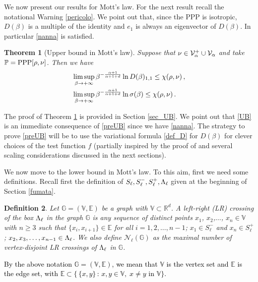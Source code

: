 \documentclass[12pt,a4paper,reqno]{amsart}
\newtheorem{Theorem}{Theorem}[section]
\newtheorem{Definition}[Theorem]{Definition}
\newcommand{\cN}{\ensuremath{\mathcal N}}
\newcommand{\cV}{\ensuremath{\mathcal V}}
\newcommand{\bbE}{{\ensuremath{\mathbb E}} }
\newcommand{\bbG}{{\ensuremath{\mathbb G}} }
\newcommand{\bbP}{{\ensuremath{\mathbb P}} }
\newcommand{\bbR}{{\ensuremath{\mathbb R}} }
\newcommand{\bbV}{{\ensuremath{\mathbb V}} }
\let\a=\alpha \let\b=\beta   \let\d=\delta  \let\e=\varepsilon
\newcommand{\rosso}{\textcolor{black}} %
\newcommand{\cv}{\rosso{\cV_\alpha}}
\newcommand{\cvp}{\rosso{\cV^+_\alpha}}
\begin{document}
We now present our results for Mott's law. For the next result recall  the notational Warning \ref{pericolo}. We point out that, since the PPP is isotropic, $D(\b)$ is a multiple of the identity and $e_1$ is always an eigenvector of $D(\b)$. In particular \eqref{nanna} is satisfied.

  \begin{Theorem}[Upper bound in Mott's law] \label{parataUB} Suppose that  $\nu\in \cvp\cup \cv$ and take $\bbP={\rm PPP}[\rho,\nu]$.
Then we have 
 \begin{align}
 &  \limsup _{\b\to +\infty} \b^{- \rosso{\frac{\a+1}{\a+1+d}} } \ln  D(\b)_{1,1}  \leq
  \chi (\rho, \nu)\,, \label{preUB}\\
&  \limsup _{\b\to +\infty} \b^{- \rosso{\frac{\a+1}{\a+1+d}} } \ln \s(\b)\leq   
\chi (\rho, \nu)
\,.\label{UB}
  \end{align}
\end{Theorem}
The proof of Theorem \ref{parataUB} is provided in Section \ref{sec_UB}. We point out that \eqref{UB} is an immediate consequence of \eqref{preUB} since we have  \eqref{nanna}. The strategy to prove \eqref{preUB} will be to use the variational formula \eqref{def_D} for $D(\b)$ for clever choices of the test function $f$ (partially inspired by the proof of \cite[Theorem~3.12]{PR} and several scaling considerations discussed in the next sections).

\smallskip

We now move to the lower bound in Mott's law.
To this aim, first we need some definitions.
Recall first the definition of $S_\ell, S_\ell^-, S_\ell^+, \Lambda_\ell$ given at the beginning of Section \ref{fumata}.
\begin{Definition}\label{def_LR} Let $\bbG=(\bbV,\bbE)$ be a graph with $\bbV\subset \bbR^d$.
A left-right (LR) crossing  of  the box $\Lambda_\ell$ in the graph  $\bbG$    is any  sequence of distinct points $x_1$, $x_2$,$\dots$, $x_n \in \bbV$  with $n\geq 3$  such that 
$\{x_i ,x_{i+1}\} \in  \bbE$ for all $i=1,2,\dots, n-1$;
$x_1 \in S_\ell^{-} $ and   $x_n \in S_\ell^+ $;
$x_2, x_3,\dots, x_{n-1}\in \Lambda_\ell$.
We also define $\cN_\ell(\bbG)$ as the  maximal number of  vertex-disjoint LR crossings of $\Lambda_\ell$ in $\bbG$.
\end{Definition}
\rosso{By the above notation $\bbG=(\bbV,\bbE)$, we mean that $\bbV$ is the vertex set and $\bbE$ is the edge set, with $\bbE\subset \big\{ \,\{x,y\} \,:\, x,y\in \bbV,\;x\not=y \text{ in }\bbV\big\}$.}
\end{document}
